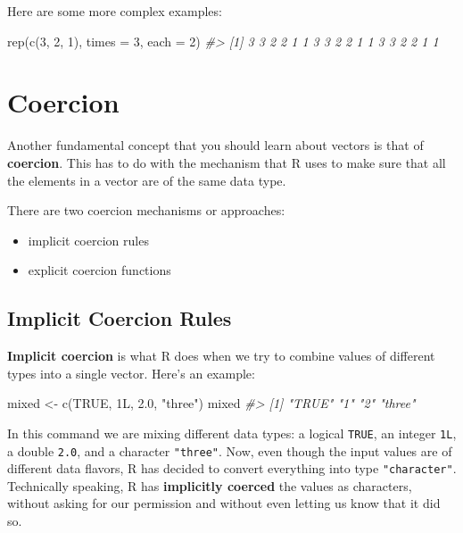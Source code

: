 \documentclass[
]{book}
\newenvironment{Shaded}{\begin{snugshade}}{\end{snugshade}}
\newcommand{\AttributeTok}[1]{\textcolor[rgb]{0.77,0.63,0.00}{#1}}
\newcommand{\CommentTok}[1]{\textcolor[rgb]{0.56,0.35,0.01}{\textit{#1}}}
\newcommand{\ConstantTok}[1]{\textcolor[rgb]{0.00,0.00,0.00}{#1}}
\newcommand{\DecValTok}[1]{\textcolor[rgb]{0.00,0.00,0.81}{#1}}
\newcommand{\FloatTok}[1]{\textcolor[rgb]{0.00,0.00,0.81}{#1}}
\newcommand{\FunctionTok}[1]{\textcolor[rgb]{0.00,0.00,0.00}{#1}}
\newcommand{\NormalTok}[1]{#1}
\newcommand{\OtherTok}[1]{\textcolor[rgb]{0.56,0.35,0.01}{#1}}
\newcommand{\StringTok}[1]{\textcolor[rgb]{0.31,0.60,0.02}{#1}}
\begin{document}
Here are some more complex examples:

\begin{Shaded}
\begin{Highlighting}[]
\FunctionTok{rep}\NormalTok{(}\FunctionTok{c}\NormalTok{(}\DecValTok{3}\NormalTok{, }\DecValTok{2}\NormalTok{, }\DecValTok{1}\NormalTok{), }\AttributeTok{times =} \DecValTok{3}\NormalTok{, }\AttributeTok{each =} \DecValTok{2}\NormalTok{)}
\CommentTok{\#\textgreater{}  [1] 3 3 2 2 1 1 3 3 2 2 1 1 3 3 2 2 1 1}
\end{Highlighting}
\end{Shaded}

\hypertarget{coercion}{%
\section{Coercion}\label{coercion}}

Another fundamental concept that you should learn about vectors is that of
\textbf{coercion}. This has to do with the mechanism that R uses to make sure that
all the elements in a vector are of the same data type.

There are two coercion mechanisms or approaches:

\begin{itemize}
\item
  implicit coercion rules
\item
  explicit coercion functions
\end{itemize}

\hypertarget{implicit-coercion-rules}{%
\subsection{Implicit Coercion Rules}\label{implicit-coercion-rules}}

\textbf{Implicit coercion} is what R does when we try to combine values of different
types into a single vector. Here's an example:

\begin{Shaded}
\begin{Highlighting}[]
\NormalTok{mixed }\OtherTok{\textless{}{-}} \FunctionTok{c}\NormalTok{(}\ConstantTok{TRUE}\NormalTok{, 1L, }\FloatTok{2.0}\NormalTok{, }\StringTok{"three"}\NormalTok{)}
\NormalTok{mixed}
\CommentTok{\#\textgreater{} [1] "TRUE"  "1"     "2"     "three"}
\end{Highlighting}
\end{Shaded}

In this command we are mixing different data types: a logical \texttt{TRUE}, an integer
\texttt{1L}, a double \texttt{2.0}, and a character \texttt{"three"}. Now, even though the input
values are of different data flavors, R has decided to convert everything into
type \texttt{"character"}. Technically speaking, R has \textbf{implicitly coerced} the
values as characters, without asking for our permission and without even
letting us know that it did so.
\end{document}
